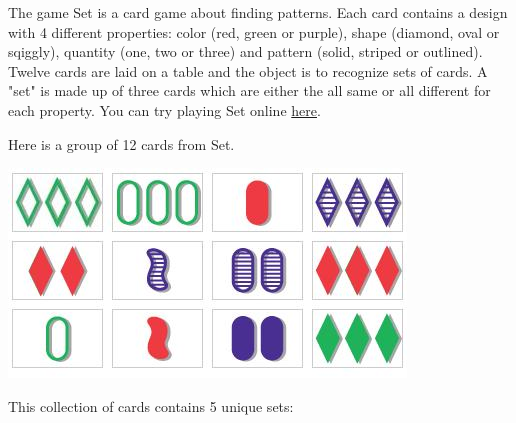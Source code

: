 \begin{problem}
The game Set is a card game about finding patterns. Each card contains a design with 4 different properties: color (red, green or purple), shape (diamond, oval or sqiggly), quantity (one, two or three) and pattern (solid, striped or outlined). Twelve cards are laid on a table and the object is to recognize sets of cards. A "set" is made up of three cards which are either the all same or all different for each property. You can try playing Set online \href{http://smart-games.org/en/set/start}{here}.

Here is a group of 12 cards from Set.

\vspace{5mm} 

\includegraphics{set_game.jpg}

\vspace{5mm} 

This collection of cards contains 5 unique sets:
\vspace{5mm}


\end{problem}
